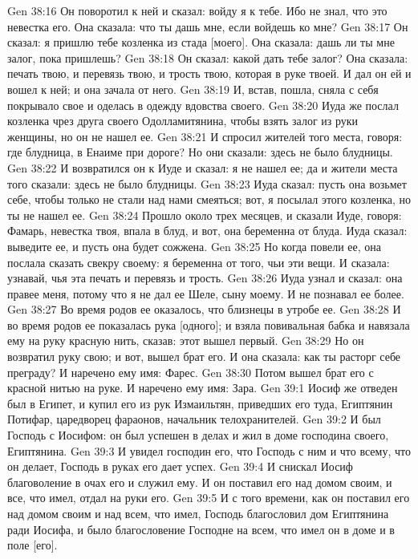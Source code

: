 \vs Gen 38:16 Он поворотил к ней и сказал: войду я к тебе. Ибо не знал, что это невестка его. Она сказала: что ты дашь мне, если войдешь ко мне?
\vs Gen 38:17 Он сказал: я пришлю тебе козленка из стада [моего]. Она сказала: дашь ли ты мне залог, пока пришлешь?
\vs Gen 38:18 Он сказал: какой дать тебе залог? Она сказала: печать твою, и перевязь твою, и трость твою, которая в руке твоей. И дал он ей и вошел к ней; и она зачала от него.
\vs Gen 38:19 И, встав, пошла, сняла с себя покрывало свое и оделась в одежду вдовства своего.
\vs Gen 38:20 Иуда же послал козленка чрез друга своего Одолламитянина, чтобы взять залог из руки женщины, но он не нашел ее.
\vs Gen 38:21 И спросил жителей того места, говоря: где блудница,  в Енаиме при дороге? Но они сказали: здесь не было блудницы.
\vs Gen 38:22 И возвратился он к Иуде и сказал: я не нашел ее; да и жители места того сказали: здесь не было блудницы.
\vs Gen 38:23 Иуда сказал: пусть она возьмет себе, чтобы только не стали над нами смеяться; вот, я посылал этого козленка, но ты не нашел ее.
\vs Gen 38:24 Прошло около трех месяцев, и сказали Иуде, говоря: Фамарь, невестка твоя, впала в блуд, и вот, она беременна от блуда. Иуда сказал: выведите ее, и пусть она будет сожжена.
\vs Gen 38:25 Но когда повели ее, она послала сказать свекру своему: я беременна от того, чьи эти вещи. И сказала: узнавай, чья эта печать и перевязь и трость.
\vs Gen 38:26 Иуда узнал и сказал: она правее меня, потому что я не дал ее Шеле, сыну моему. И не познавал ее более.
\vs Gen 38:27 Во время родов ее оказалось, что близнецы в утробе ее.
\vs Gen 38:28 И во время родов ее показалась рука [одного]; и взяла повивальная бабка и навязала ему на руку красную нить, сказав: этот вышел первый.
\vs Gen 38:29 Но он возвратил руку свою; и вот, вышел брат его. И она сказала: как ты расторг себе преграду? И наречено ему имя: Фарес.
\vs Gen 38:30 Потом вышел брат его с красной нитью на руке. И наречено ему имя: Зара.
\vs Gen 39:1 Иосиф же отведен был в Египет, и купил его из рук Измаильтян, приведших его туда, Египтянин Потифар, царедворец фараонов, начальник телохранителей.
\vs Gen 39:2 И был Господь с Иосифом: он был успешен в делах и жил в доме господина своего, Египтянина.
\vs Gen 39:3 И увидел господин его, что Господь с ним и что всему, что он делает, Господь в руках его дает успех.
\vs Gen 39:4 И снискал Иосиф благоволение в очах его и служил ему. И он поставил его над домом своим, и все, что имел, отдал на руки его.
\vs Gen 39:5 И с того времени, как он поставил его над домом своим и над всем, что имел, Господь благословил дом Египтянина ради Иосифа, и было благословение Господне на всем, что имел он в доме и в поле [его].
